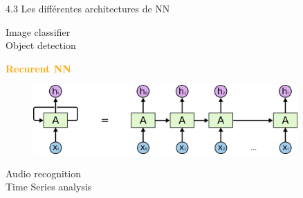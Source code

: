 \begin{frame}{4.3 Les différentes architectures de NN}
\begin{minipage}{.3\textwidth}
    Image classifier\\
    Object detection\\
  \end{minipage}  
  \begin{minipage}{.3\textwidth}
    \begin{center}
      \textbf{\textcolor{orange}{Recurent NN}}
    \end{center}
    \begin{figure}
      \includegraphics[width=0.9\textwidth,height=0.2\textheight]{fig/RNN.png}
    \end{figure}
    Audio recognition\\
    Time Series analysis\\
  \end{minipage}
\end{frame}

